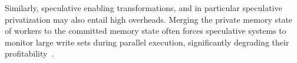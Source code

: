 Similarly,
speculative enabling transformations, and
in particular speculative privatization
may also entail high overheads.
%
%
%
%
%
%
Merging the private memory state of workers to the committed memory
state often forces speculative systems to monitor large write sets
during parallel execution, significantly degrading their
profitability~\cite{kim:12:cgo,johnson:12:pldi}.
%

%
%
%

%
%

